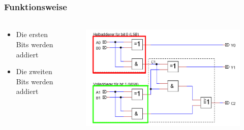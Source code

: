 \begin{frame}
    \frametitle{Funktionsweise}
    \framesubtitle{}
     \begin{columns}[c]
            \begin{block}{}
                \begin{itemize}
                    \item Die ersten Bits werden addiert
                    \item Die zweiten Bits werden addiert
                \end{itemize}
            \end{block}
            \begin{figure}[H]
            \begin{center}
                    \includegraphics[scale=0.4]{./img/schaltung/Volladdierer_fun_2.png}
            \end{center}
            \end{figure}
     \end{columns}
\end{frame}
